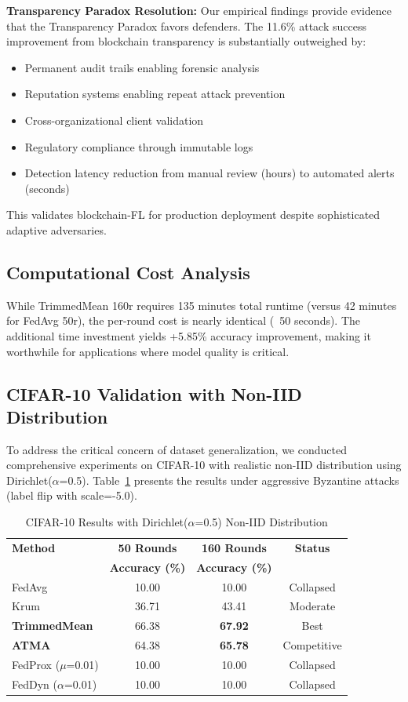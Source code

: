 \documentclass{ieeeaccess}
\begin{document}
\textbf{Transparency Paradox Resolution:} Our empirical findings provide evidence that the Transparency Paradox favors defenders. The 11.6\% attack success improvement from blockchain transparency is substantially outweighed by:
\begin{itemize}
    \item Permanent audit trails enabling forensic analysis
    \item Reputation systems enabling repeat attack prevention
    \item Cross-organizational client validation
    \item Regulatory compliance through immutable logs
    \item Detection latency reduction from manual review (hours) to automated alerts (seconds)
\end{itemize}

This validates blockchain-FL for production deployment despite sophisticated adaptive adversaries.

\subsection{Computational Cost Analysis}

While TrimmedMean 160r requires 135 minutes total runtime (versus 42 minutes for FedAvg 50r), the per-round cost is nearly identical (~50 seconds). The additional time investment yields +5.85\% accuracy improvement, making it worthwhile for applications where model quality is critical.

\subsection{CIFAR-10 Validation with Non-IID Distribution}
\label{sec:cifar10}

To address the critical concern of dataset generalization, we conducted comprehensive experiments on CIFAR-10 with realistic non-IID distribution using Dirichlet($\alpha$=0.5). Table~\ref{tab:cifar10_results} presents the results under aggressive Byzantine attacks (label flip with scale=-5.0).

\begin{table}[t]
\caption{CIFAR-10 Results with Dirichlet($\alpha$=0.5) Non-IID Distribution}
\label{tab:cifar10_results}
\centering
\begin{tabular}{lccc}
\toprule
\textbf{Method} & \textbf{50 Rounds} & \textbf{160 Rounds} & \textbf{Status} \\
& \textbf{Accuracy (\%)} & \textbf{Accuracy (\%)} & \\
\midrule
FedAvg & 10.00 & 10.00 & Collapsed \\
Krum & 36.71 & 43.41 & Moderate \\
\textbf{TrimmedMean} & 66.38 & \textbf{67.92} & Best \\
\textbf{ATMA} & 64.38 & \textbf{65.78} & Competitive \\
FedProx ($\mu$=0.01) & 10.00 & 10.00 & Collapsed \\
FedDyn ($\alpha$=0.01) & 10.00 & 10.00 & Collapsed \\
\bottomrule
\end{tabular}
\end{table}
\end{document}
